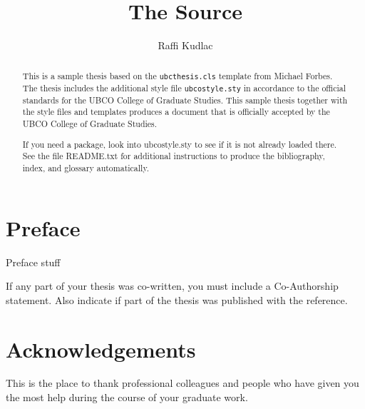 \documentclass[msc,oneside]{ubcthesis}%
\title{The Source}
\author{Raffi Kudlac} %
\begin{document}
\frontmatter                    %

\maketitle                      %

\begin{abstract}                %
This is a sample thesis based on the \texttt{ubcthesis.cls} template
from Michael Forbes. The thesis includes the additional style file
\texttt{ubcostyle.sty} in accordance to the official standards for
the UBCO College of Graduate Studies.
This sample thesis together with the style files and templates
produces a document that is officially accepted by the UBCO College of Graduate Studies. 

If you need a package, look into ubcostyle.sty to see if it is not already loaded there. 
See the file README.txt for additional instructions to produce the bibliography, index, and glossary automatically.
\end{abstract}

\chapter{Preface}
Preface stuff

If any part of your thesis was co-written, you must include a
Co-Author\-ship statement. Also indicate if part of the thesis was published with the reference.

\newpage
{} \label{tableofcontent}%
\tableofcontents                %
\newpage 
{} \label{listoftab}%
\listoftables                   %
\newpage
{} \label{listoffig}%
\listoffigures                  %


\chapter{Acknowledgements}      %
This is the place to thank professional colleagues and people who have
given you the most help during the course of your graduate work.
\end{document}
